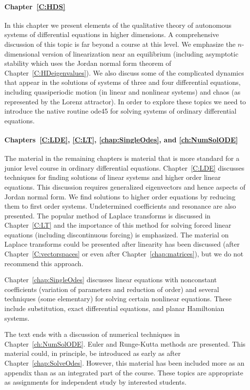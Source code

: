 \documentclass{ximera}
\begin{document}
\paragraph{Chapter~\ref{C:HDS}}  In this chapter we present elements of the
qualitative theory of autonomous systems of differential equations in higher
dimensions.  A comprehensive discussion of this topic is far beyond a course 
at this level.  We emphasize the $n$-dimensional version of linearization near
an equilibrium (including asymptotic stability which uses the Jordan normal 
form theorem of Chapter~\ref{C:HDeigenvalues}).  We also discuss some of the 
complicated dynamics that appear in the solutions of systems of three and 
four differential equations, including quasiperiodic motion (in linear and 
nonlinear systems) and chaos (as represented by the Lorenz attractor).  In 
order to explore these topics we need to introduce the \Matlab native routine 
{\sf ode45} for solving systems of ordinary differential equations.

\paragraph{Chapters~\ref{C:LDE}, \ref{C:LT}, \ref{chap:SingleOdes}, and 
\ref{ch:NumSolODE}}  The material in the remaining chapters is material that 
is more standard for a junior level course in ordinary differential equations.
Chapter~\ref{C:LDE} discusses techniques for finding solutions of linear 
systems and higher order linear equations.  This discussion requires 
generalized eigenvectors and hence aspects of Jordan normal form.  We find 
solutions to higher order equations by reducing them to first order systems.  
Undetermined coefficients and resonance are also presented.  The popular 
method of Laplace transforms 
is discussed in Chapter~\ref{C:LT} and the importance of this method for
solving forced linear equations (including discontinuous forcing) is
emphasized.  The material on Laplace transforms could be presented after
linearity has been discussed (after Chapter~\ref{C:vectorspaces} or even 
after Chapter~\ref{chap:matrices}), but we do not recommend this approach.

Chapter~\ref{chap:SingleOdes} discusses linear equations with nonconstant
coefficients (variation of parameters and reduction of order) and several
techniques (some elementary) for solving certain nonlinear equations.  These
include substitution, exact differential equations, and planar Hamiltonian
systems.

The text ends with a discussion of numerical techniques in 
Chapter~\ref{ch:NumSolODE}.  Euler and Runge-Kutta methods are presented. 
This material could, in principle, be introduced as early as after
Chapter~\ref{chap:SolveOdes}.   However, this material has been included more
as an appendix than as an integrated part of the course.  These topics are
appropriate as assignments for independent study by interested students.
\end{document}
